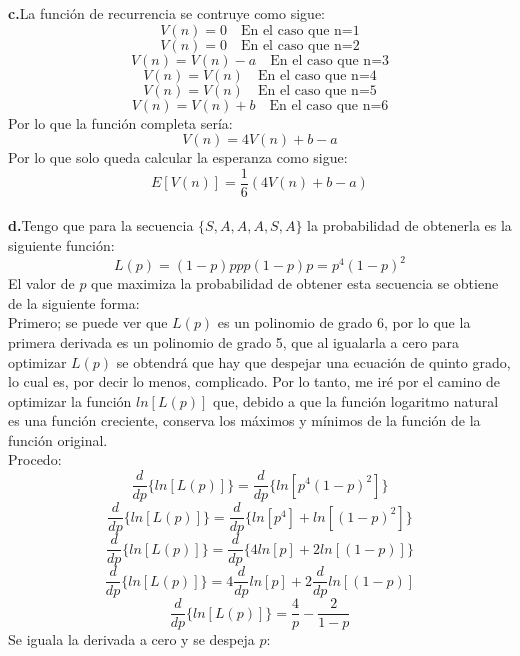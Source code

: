 \documentclass[14pt,a4paper]{report}
\begin{document}
\textbf{c.}\quad La función de recurrencia se contruye como sigue:\\
$$
	V(n)=0\quad\text{En el caso que n=1}
$$
$$
	V(n)=0\quad\text{En el caso que n=2}
$$
$$
	V(n)=V(n)-a\quad\text{En el caso que n=3}
$$
$$
	V(n)=V(n)\quad\text{En el caso que n=4}
$$
$$
	V(n)=V(n)\quad\text{En el caso que n=5}
$$
$$
	V(n)=V(n)+b\quad\text{En el caso que n=6}
$$
Por lo que la función completa sería:\\
\begin{equation}
	V(n)=4V(n)+b-a
\end{equation}
Por lo que solo queda calcular la esperanza como sigue:
$$
E[V(n)]=\frac{1}{6}(4V(n)+b-a)		
$$
\\
\textbf{d.}\quad Tengo que para la secuencia $\{S,A,A,A,S,A\}$ la probabilidad de obtenerla es la siguiente función: 
\begin{equation}
L(p)=(1-p)ppp(1-p)p=p^{4}(1-p)^{2}
\end{equation}
El valor de $p$ que maximiza la probabilidad de obtener esta secuencia se obtiene de la siguiente forma:\\
Primero; se puede ver que $L(p)$ es un polinomio de grado 6, por lo que la primera derivada es un polinomio de grado 5, que al igualarla a cero para optimizar $L(p)$ se obtendrá que hay que despejar una ecuación de quinto grado, lo cual es, por decir lo menos, complicado. Por lo tanto, me iré por el camino de optimizar la función $ln[L(p)]$ que, debido a que la función logaritmo natural es una función creciente, conserva los máximos y mínimos de la función de la función original.\\
Procedo:
\begin{equation}
\frac{d}{dp}\{ln[L(p)]\}=\frac{d}{dp}\{ln[p^4(1-p)^{2}]\}
\end{equation}
\begin{equation*}
\frac{d}{dp}\{ln[L(p)]\}=\frac{d}{dp}\{ln[p^4]+ln[(1-p)^{2}]\}
\end{equation*}
\begin{equation*}
\frac{d}{dp}\{ln[L(p)]\}=\frac{d}{dp}\{4ln[p]+2ln[(1-p)]\}
\end{equation*}
\begin{equation*}
\frac{d}{dp}\{ln[L(p)]\}=4\frac{d}{dp}ln[p]+2\frac{d}{dp}ln[(1-p)]
\end{equation*}
\begin{equation}
\frac{d}{dp}\{ln[L(p)]\}=\frac{4}{p}-\frac{2}{1-p}
\end{equation}
Se iguala la derivada a cero y se despeja $p$:\\
\end{document}
